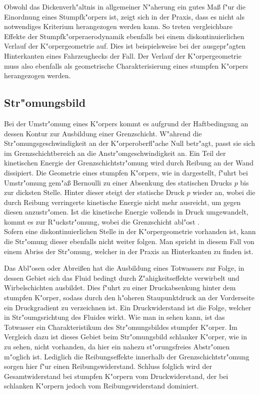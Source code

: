 Obwohl das Dickenverh"altnis in allgemeiner N"aherung ein gutes Ma\ss{} f"ur die Einordnung eines Stumpfk"orpers ist, zeigt sich in der Praxis, dass es nicht als notwendiges Kriterium herangezogen werden kann. So treten vergleichbare Effekte der Stumpfk"orperaerodynamik ebenfalls bei einem diskontinuierlichen Verlauf der K"orpergeometrie auf. Dies ist beispielsweise bei der ausgepr"agten Hinterkanten eines Fahrzeughecks der Fall. Der Verlauf der K"orpergeometrie muss also ebenfalls als geometrische Charakterisierung eines stumpfen K"orpers herangezogen werden.


\subsection{Str"omungsbild}
\label{sec:Stromungsbild}
Bei der Umstr"omung eines K"orpers kommt es aufgrund der Haftbedingung an dessen Kontur zur Ausbildung einer Grenzschicht. W"ahrend die Str"omungsgeschwindigkeit an der K"orperoberfl"ache Null betr"agt, passt sie sich im Grenzschichtbereich an die Anstr"omgeschwindigkeit an. Ein Teil der kinetischen Energie der Grenzschichtstr"omung wird durch Reibung an der Wand dissipiert.
Die Geometrie eines stumpfen K"orpers, wie in  dargestellt, f"uhrt bei Umstr"omung gem"a\ss{} Bernoulli zu einer Absenkung des statischen Drucks $p$ bis zur dicksten Stelle. Hinter dieser steigt der statische Druck $p$ wieder an, wobei die durch Reibung verringerte kinetische Energie nicht mehr ausreicht, um gegen diesen anzustr"omen. Ist die kinetische Energie vollends in Druck umgewandelt, kommt es zur R"uckstr"omung, wobei die Grenzschicht abl"ost \cite{Hucho.2011}.\\
Sofern eine diskontinuierlichen Stelle in der K"orpergeometrie vorhanden ist, kann die Str"omung dieser ebenfalls nicht weiter folgen. Man spricht in diesem Fall von einem Abriss der Str"omung, welcher in der Praxis an Hinterkanten zu finden ist.

Das Abl"osen oder Abrei\ss{}en hat die Ausbildung eines Totwassers zur Folge, in dessen Gebiet sich das Fluid bedingt durch Z"ahigkeitseffekte verwirbelt und Wirbelschichten ausbildet. Dies f"uhrt zu einer Druckabsenkung hinter dem stumpfen K"orper, sodass durch den h"oheren Staupunktdruck an der Vorderseite ein Druckgradient zu verzeichnen ist. Ein Druckwiderstand ist die Folge, welcher in Str"oumgsrichtung des Fluides wirkt. Wie man in  sehen kann, ist das Totwasser ein Charakteristikum des Str"omungsbildes stumpfer K"orper. Im Vergleich dazu ist dieses Gebiet beim Str"omungsbild schlanker K"orper, wie in  zu sehen, nicht vorhanden, da hier ein nahezu st"orungsfreies Abstr"omen m"oglich ist. Lediglich die Reibungseffekte innerhalb der Grenzschichtstr"omung sorgen hier f"ur einen Reibungswiderstand. Schluss folglich wird der Gesamtwiderstand bei stumpfen K"orpern vom Druckwiderstand, der bei schlanken K"orpern jedoch vom Reibungswiderstand dominiert.

